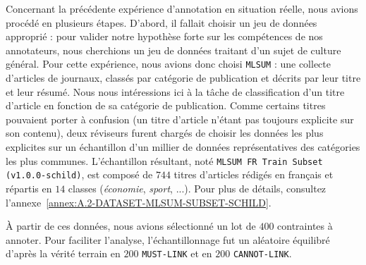 			Concernant la précédente expérience d'annotation en situation réelle, nous avions procédé en plusieurs étapes.
			D'abord, il fallait choisir un jeu de données approprié : pour valider notre hypothèse forte sur les compétences de nos annotateurs, nous cherchions un jeu de données traitant d'un sujet de culture général.
			Pour cette expérience, nous avions donc choisi \texttt{MLSUM} : une collecte d'articles de journaux, classés par catégorie de publication et décrits par leur titre et leur résumé.
			Nous nous intéressions ici à la tâche de classification d'un titre d'article en fonction de sa catégorie de publication.
			Comme certains titres pouvaient porter à confusion (un titre d'article n'étant pas toujours explicite sur son contenu), deux réviseurs furent chargés de choisir les données les plus explicites sur un échantillon d'un millier de données représentatives des catégories les plus communes.
			L'échantillon résultant, noté \texttt{MLSUM FR Train Subset (v1.0.0-schild)}, est composé de $744$ titres d'articles rédigés en français et répartis en $14$ classes (\textit{économie}, \textit{sport}, ...).
			Pour plus de détails, consultez l'annexe~\ref{annex:A.2-DATASET-MLSUM-SUBSET-SCHILD}.
		
			À partir de ces données, nous avions sélectionné un lot de $400$ contraintes à annoter.
			Pour faciliter l'analyse, l'échantillonnage fut un aléatoire équilibré d'après la vérité terrain en $200$ \texttt{MUST-LINK} et en $200$ \texttt{CANNOT-LINK}.
			
